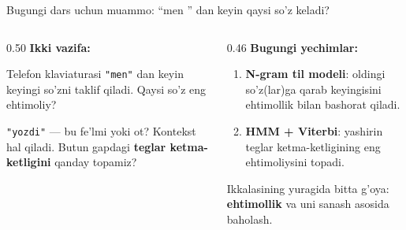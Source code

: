 \documentclass[aspectratio=169,11pt]{beamer}
\begin{document}
\begin{frame}{Bugungi dars uchun muammo: ``men \underline{\hspace{0.6cm}}'' dan keyin qaysi so'z keladi?}
  \begin{columns}[T]
    \begin{column}{0.50\textwidth}
      \textbf{Ikki vazifa:}\\[3pt]
      \small
      \begin{tcolorbox}[warnbox,title=1. Avtomatik to'ldirish,top=2pt,bottom=2pt]
        \footnotesize
        Telefon klaviaturasi \texttt{"men"} dan keyin keyingi so'zni taklif
        qiladi. Qaysi so'z eng ehtimoliy?
      \end{tcolorbox}
      \vspace{3pt}
      \begin{tcolorbox}[warnbox,title=2. So'z turkumini aniqlash,top=2pt,bottom=2pt]
        \footnotesize
        \texttt{"yozdi"} --- bu fe'lmi yoki ot? Kontekst hal qiladi.
        Butun gapdagi \textbf{teglar ketma-ketligini} qanday topamiz?
      \end{tcolorbox}
    \end{column}
    \begin{column}{0.46\textwidth}
      \textbf{Bugungi yechimlar:}\\[4pt]
      \small
      \begin{enumerate}\setlength\itemsep{4pt}
        \item \textbf{N-gram til modeli}: oldingi so'z(lar)ga qarab keyingisini
              ehtimollik bilan bashorat qiladi.
        \item \textbf{HMM + Viterbi}: yashirin teglar ketma-ketligining eng
              ehtimoliysini topadi.
      \end{enumerate}
      \vspace{5pt}
      \begin{tcolorbox}[okbox,top=2pt,bottom=2pt]
        \footnotesize
        Ikkalasining yuragida bitta g'oya: \textbf{ehtimollik} va uni
        sanash asosida baholash.
      \end{tcolorbox}
    \end{column}
  \end{columns}
\end{frame}

\end{document}
